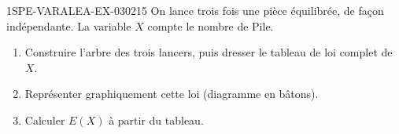 \begin{exercice}{1SPE-VARALEA-EX-030}{2}{15}
On lance trois fois une pièce équilibrée, de façon indépendante. La variable $X$ compte le nombre de Pile.

\begin{enumerate}
  \item Construire l'arbre des trois lancers, puis dresser le tableau de loi complet de $X$.
  \item Représenter graphiquement cette loi (diagramme en bâtons).
  \item Calculer $E(X)$ à partir du tableau.
\end{enumerate}
\end{exercice}
